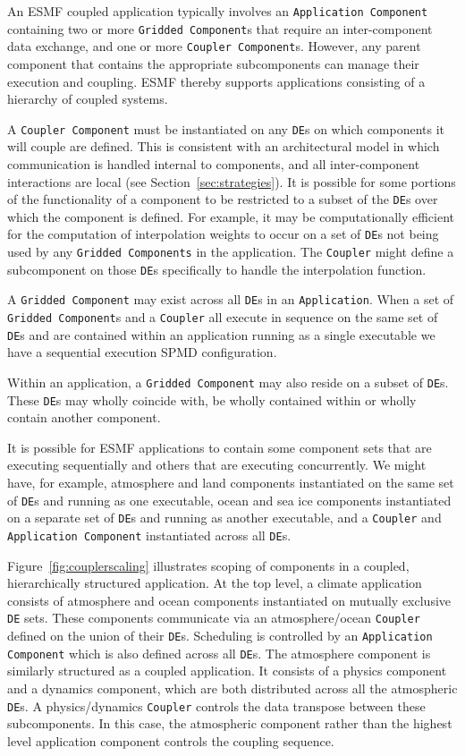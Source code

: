 An ESMF coupled application typically involves an {\tt Application Component} 
containing two or more {\tt Gridded Component}s that require an 
inter-component data exchange, and one or more {\tt Coupler 
Component}s.  However, any parent component that contains the appropriate 
subcomponents can manage their execution and coupling.  ESMF thereby
supports applications consisting of a hierarchy of coupled systems.

A {\tt Coupler Component} must be instantiated on any {\tt DE}s on which components
it will couple are defined.  This is consistent with an architectural
model in which communication is handled internal to components, and all
inter-component interactions are local (see Section~\ref{sec:strategies}).  
It is possible for
some portions of the functionality of a component to be restricted to
a subset of the {\tt DE}s over which the component is defined.  For example, 
it may be computationally efficient for the computation of interpolation
weights to occur on a set of {\tt DE}s not being used by any {\tt Gridded 
Components}
in the application.  The {\tt Coupler} might define a subcomponent on 
those {\tt DE}s specifically to handle the interpolation function.

A {\tt Gridded Component} may exist across all {\tt DE}s in an {\tt Application}.  
When a set of {\tt Gridded  Component}s and a {\tt Coupler} all execute in sequence on 
the same set of {\tt DE}s and are contained within an application running 
as a single executable we have a sequential execution SPMD configuration.  

Within an application, a {\tt Gridded Component} may also reside on 
a subset of {\tt DE}s.  These {\tt DE}s may wholly coincide with, be wholly 
contained within or wholly contain another component.  

It is possible for ESMF applications to contain some component sets
that are executing sequentially and others that are executing concurrently.
We might have, for example, atmosphere and land components instantiated 
on the same set of 
{\tt DE}s and running as one executable, ocean and sea ice 
components instantiated on a separate set of {\tt DE}s and running as 
another executable, and a {\tt Coupler} and {\tt Application Component} 
instantiated across all {\tt DE}s.

Figure~\ref{fig:couplerscaling} illustrates scoping of components
in a coupled, hierarchically structured application.  At the top level, 
a climate application consists of atmosphere and ocean components 
instantiated on mutually exclusive {\tt DE} sets.  These components communicate 
via an atmosphere/ocean {\tt Coupler} defined on the union of their {\tt DE}s.  
Scheduling is controlled by an {\tt Application
Component} which is also defined across all {\tt DE}s.  The atmosphere component
is similarly structured as a coupled application.  It consists of a 
physics component and a dynamics component, which are both distributed
across all the atmospheric {\tt DE}s.  A physics/dynamics {\tt Coupler} controls
the data transpose between these subcomponents.  In this case, the
atmospheric component rather than the highest level application component
controls the coupling sequence.  

